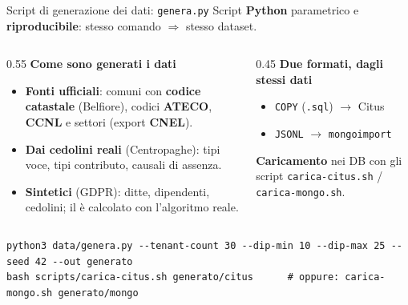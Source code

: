 \documentclass[aspectratio=169,11pt]{beamer}
\begin{document}
\begin{frame}[fragile]{Script di generazione dei dati: \texttt{genera.py}}
  \small Script \textbf{Python} parametrico e \textbf{riproducibile}: stesso comando $\Rightarrow$ stesso dataset.
  \vspace{0.3em}
  \begin{columns}[T]
    \begin{column}{0.55\textwidth}
      \textbf{Come sono generati i dati}
      \begin{itemize}\setlength\itemsep{2pt}
        \item \textbf{Fonti ufficiali}: comuni con \textbf{codice catastale} (Belfiore), codici \textbf{ATECO}, \textbf{CCNL} e settori (export \textbf{CNEL}).
        \item \textbf{Dai cedolini reali} (Centropaghe): tipi voce, tipi contributo, causali di assenza.
        \item \textbf{Sintetici} (GDPR): ditte, dipendenti, cedolini; il  è calcolato con l'algoritmo reale.
      \end{itemize}
    \end{column}
    \begin{column}{0.45\textwidth}
      \textbf{Due formati, dagli stessi dati}
      \begin{itemize}\setlength\itemsep{2pt}
        \item \texttt{COPY} (\texttt{.sql}) $\rightarrow$ Citus
        \item \texttt{JSONL} $\rightarrow$ \texttt{mongoimport}
      \end{itemize}
      \vspace{0.3em}
      \textbf{Caricamento} nei DB con gli script \texttt{carica-citus.sh} / \texttt{carica-mongo.sh}.
    \end{column}
  \end{columns}
  \vspace{0.2em}
  \begin{lstlisting}[basicstyle=\ttfamily\scriptsize,aboveskip=2pt,belowskip=0pt]
python3 data/genera.py --tenant-count 30 --dip-min 10 --dip-max 25 --seed 42 --out generato
bash scripts/carica-citus.sh generato/citus      # oppure: carica-mongo.sh generato/mongo
  \end{lstlisting}
\end{frame}
\end{document}
